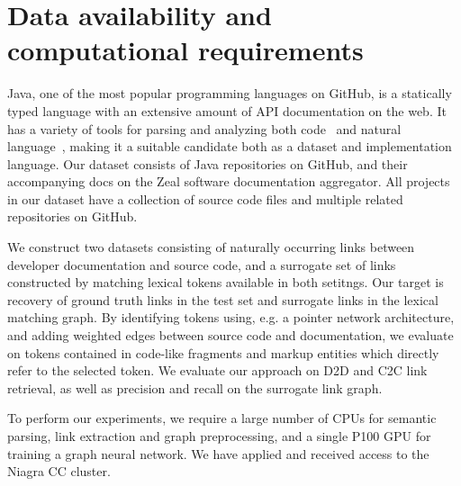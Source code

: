 \documentclass{article}
\begin{document}
\section{Data availability and computational requirements}

Java, one of the most popular programming languages on GitHub, is a statically typed language with an extensive amount of API documentation on the web. It has a variety of tools for parsing and analyzing both code~\citep{kovalenko2019pathminer} and natural language~\citep{manning2014stanford, grella2018non}, making it a suitable candidate both as a dataset and implementation language. Our dataset consists of Java repositories on GitHub, and their accompanying docs on the Zeal software documentation aggregator. All projects in our dataset have a collection of source code files and multiple related repositories on GitHub.

We construct two datasets consisting of naturally occurring links between developer documentation and source code, and a surrogate set of links constructed by matching lexical tokens available in both setitngs. Our target is recovery of ground truth links in the test set and surrogate links in the lexical matching graph. By identifying tokens using, e.g. a pointer network architecture, and adding weighted edges between source code and documentation, we evaluate on tokens contained in code-like fragments and markup entities which directly refer to the selected token. We evaluate our approach on D2D and C2C link retrieval, as well as precision and recall on the surrogate link graph.

To perform our experiments, we require a large number of CPUs for semantic parsing, link extraction and graph preprocessing, and a single P100 GPU for training a graph neural network. We have applied and received access to the Niagra CC cluster.



\end{document}
